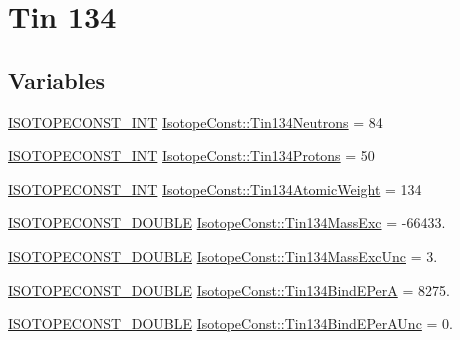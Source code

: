 \hypertarget{group___isotope_const-_tin-_sn134}{}\section{Tin 134}
\label{group___isotope_const-_tin-_sn134}
\subsection*{Variables}
\begin{DoxyCompactItemize}
\item 
\mbox{\hyperlink{group___isotope_const-_macros_ga5f18360b3e99483a35c32d789e62621c}{I\+S\+O\+T\+O\+P\+E\+C\+O\+N\+S\+T\+\_\+\+I\+NT}} \mbox{\hyperlink{group___isotope_const-_tin-_sn134_ga6bece9e87c4f8f389192914790234eaf}{Isotope\+Const\+::\+Tin134\+Neutrons}} = 84
\item 
\mbox{\hyperlink{group___isotope_const-_macros_ga5f18360b3e99483a35c32d789e62621c}{I\+S\+O\+T\+O\+P\+E\+C\+O\+N\+S\+T\+\_\+\+I\+NT}} \mbox{\hyperlink{group___isotope_const-_tin-_sn134_ga63b517188fe1f3c2d070d6f85168535e}{Isotope\+Const\+::\+Tin134\+Protons}} = 50
\item 
\mbox{\hyperlink{group___isotope_const-_macros_ga5f18360b3e99483a35c32d789e62621c}{I\+S\+O\+T\+O\+P\+E\+C\+O\+N\+S\+T\+\_\+\+I\+NT}} \mbox{\hyperlink{group___isotope_const-_tin-_sn134_gacfcfd9304071fc2728af19d2c158e5ed}{Isotope\+Const\+::\+Tin134\+Atomic\+Weight}} = 134
\item 
\mbox{\hyperlink{group___isotope_const-_macros_ga8f45a7272ce02c0b4c65c44636ed719a}{I\+S\+O\+T\+O\+P\+E\+C\+O\+N\+S\+T\+\_\+\+D\+O\+U\+B\+LE}} \mbox{\hyperlink{group___isotope_const-_tin-_sn134_ga9f425cbce3c1c4aed70ab8713b84480d}{Isotope\+Const\+::\+Tin134\+Mass\+Exc}} = -\/66433.
\item 
\mbox{\hyperlink{group___isotope_const-_macros_ga8f45a7272ce02c0b4c65c44636ed719a}{I\+S\+O\+T\+O\+P\+E\+C\+O\+N\+S\+T\+\_\+\+D\+O\+U\+B\+LE}} \mbox{\hyperlink{group___isotope_const-_tin-_sn134_gab8e0af5db127345ec2230fe299ea7836}{Isotope\+Const\+::\+Tin134\+Mass\+Exc\+Unc}} = 3.
\item 
\mbox{\hyperlink{group___isotope_const-_macros_ga8f45a7272ce02c0b4c65c44636ed719a}{I\+S\+O\+T\+O\+P\+E\+C\+O\+N\+S\+T\+\_\+\+D\+O\+U\+B\+LE}} \mbox{\hyperlink{group___isotope_const-_tin-_sn134_gae83433bedc83493a04379aaac2d9718a}{Isotope\+Const\+::\+Tin134\+Bind\+E\+PerA}} = 8275.
\item 
\mbox{\hyperlink{group___isotope_const-_macros_ga8f45a7272ce02c0b4c65c44636ed719a}{I\+S\+O\+T\+O\+P\+E\+C\+O\+N\+S\+T\+\_\+\+D\+O\+U\+B\+LE}} \mbox{\hyperlink{group___isotope_const-_tin-_sn134_gac34bd6bafd94aa8fcd21242cc8097ba1}{Isotope\+Const\+::\+Tin134\+Bind\+E\+Per\+A\+Unc}} = 0.

\end{DoxyCompactItemize}
